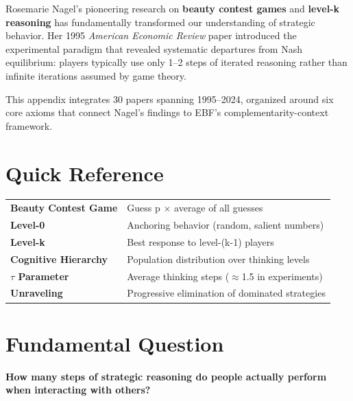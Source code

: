 Rosemarie Nagel's pioneering research on \textbf{beauty contest games} and \textbf{level-k reasoning} has fundamentally transformed our understanding of strategic behavior. Her 1995 \textit{American Economic Review} paper introduced the experimental paradigm that revealed systematic departures from Nash equilibrium: players typically use only 1--2 steps of iterated reasoning rather than infinite iterations assumed by game theory.

This appendix integrates 30 papers spanning 1995--2024, organized around six core axioms that connect Nagel's findings to EBF's complementarity-context framework.

\section{Quick Reference}

\begin{tcolorbox}[colback=yellow!5!white, colframe=yellow!75!black, title=Key Concepts]
\begin{tabular}{@{}ll@{}}
\textbf{Beauty Contest Game} & Guess p $\times$ average of all guesses \\
\textbf{Level-0} & Anchoring behavior (random, salient numbers) \\
\textbf{Level-k} & Best response to level-(k-1) players \\
\textbf{Cognitive Hierarchy} & Population distribution over thinking levels \\
\textbf{$\tau$ Parameter} & Average thinking steps ($\approx$1.5 in experiments) \\
\textbf{Unraveling} & Progressive elimination of dominated strategies \\
\end{tabular}
\end{tcolorbox}

\section{Fundamental Question}

\begin{tcolorbox}[colback=red!5!white, colframe=red!75!black,
    title=The Nagel Question]
\centering\Large
\textbf{How many steps of strategic reasoning do people actually perform when interacting with others?}
\end{tcolorbox}

